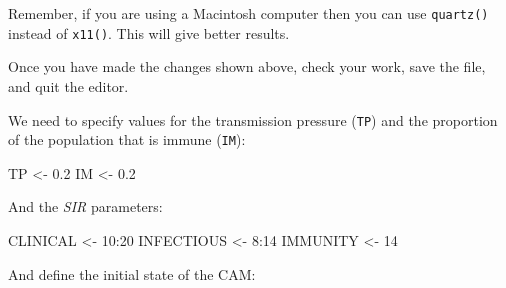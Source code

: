 \documentclass[
  12pt,
  a4paper]{book}
\newenvironment{Shaded}{\begin{snugshade}}{\end{snugshade}}
\newcommand{\DecValTok}[1]{\textcolor[rgb]{0.00,0.00,0.81}{#1}}
\newcommand{\FloatTok}[1]{\textcolor[rgb]{0.00,0.00,0.81}{#1}}
\newcommand{\NormalTok}[1]{#1}
\newcommand{\OtherTok}[1]{\textcolor[rgb]{0.56,0.35,0.01}{#1}}
\newcommand{\SpecialCharTok}[1]{\textcolor[rgb]{0.00,0.00,0.00}{#1}}
\begin{document}
Remember, if you are using a Macintosh computer then you can use \texttt{quartz()} instead of \texttt{x11()}. This will give better results.

Once you have made the changes shown above, check your work, save the file, and quit the editor.

We need to specify values for the transmission pressure (\texttt{TP}) and the proportion of the population that is
immune (\texttt{IM}):

\begin{Shaded}
\begin{Highlighting}[]
\NormalTok{TP }\OtherTok{\textless{}{-}} \FloatTok{0.2}
\NormalTok{IM }\OtherTok{\textless{}{-}} \FloatTok{0.2}
\end{Highlighting}
\end{Shaded}

And the \emph{SIR} parameters:

\begin{Shaded}
\begin{Highlighting}[]
\NormalTok{CLINICAL }\OtherTok{\textless{}{-}} \DecValTok{10}\SpecialCharTok{:}\DecValTok{20}
\NormalTok{INFECTIOUS }\OtherTok{\textless{}{-}} \DecValTok{8}\SpecialCharTok{:}\DecValTok{14}
\NormalTok{IMMUNITY }\OtherTok{\textless{}{-}} \DecValTok{14}
\end{Highlighting}
\end{Shaded}

And define the initial state of the CAM:
\end{document}
